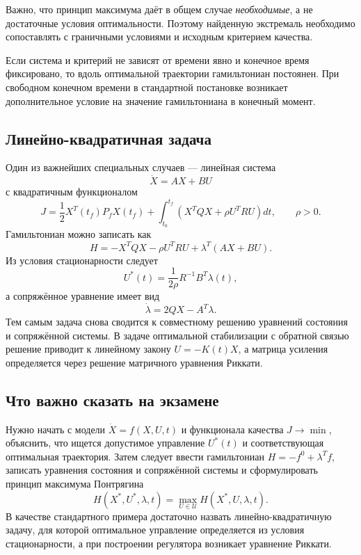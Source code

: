 Важно, что принцип максимума даёт в общем случае \emph{необходимые}, а не
достаточные условия оптимальности. Поэтому найденную экстремаль необходимо
сопоставлять с граничными условиями и исходным критерием качества.

Если система и критерий не зависят от времени явно и конечное время фиксировано,
то вдоль оптимальной траектории гамильтониан постоянен. При свободном конечном
времени в стандартной постановке возникает дополнительное условие на значение
гамильтониана в конечный момент.

\subsection{Линейно-квадратичная задача}

Один из важнейших специальных случаев --- линейная система
\[
    \dot X=AX+BU
\]
с квадратичным функционалом
\[
    J=\frac12 X^T(t_f)P_fX(t_f)+
    \int_{t_0}^{t_f}\left(X^TQX+\rho U^TRU\right)dt,
    \qquad \rho>0.
\]
Гамильтониан можно записать как
\[
    H=-X^TQX-\rho U^TRU+\lambda^T(AX+BU).
\]
Из условия стационарности следует
\[
    U^*(t)=\frac{1}{2\rho}R^{-1}B^T\lambda(t),
\]
а сопряжённое уравнение имеет вид
\[
    \dot\lambda=2QX-A^T\lambda.
\]
Тем самым задача снова сводится к совместному решению уравнений состояния и
сопряжённой системы. В задаче оптимальной стабилизации с обратной связью решение
приводит к линейному закону $U=-K(t)X$, а матрица усиления определяется через
решение матричного уравнения Риккати.

\subsection{Что важно сказать на экзамене}

Нужно начать с модели $\dot X=f(X,U,t)$ и функционала качества $J\to\min$,
объяснить, что ищется допустимое управление $U^*(t)$ и соответствующая
оптимальная траектория. Затем следует ввести гамильтониан
$H=-f^0+\lambda^Tf$, записать уравнения состояния и сопряжённой системы и
сформулировать принцип максимума Понтрягина
\[
    H(X^*,U^*,\lambda,t)=\max_{U\in\mathcal U}H(X^*,U,\lambda,t).
\]
В качестве стандартного примера достаточно назвать линейно-квадратичную задачу,
для которой оптимальное управление определяется из условия стационарности, а
при построении регулятора возникает уравнение Риккати.

\newpage
